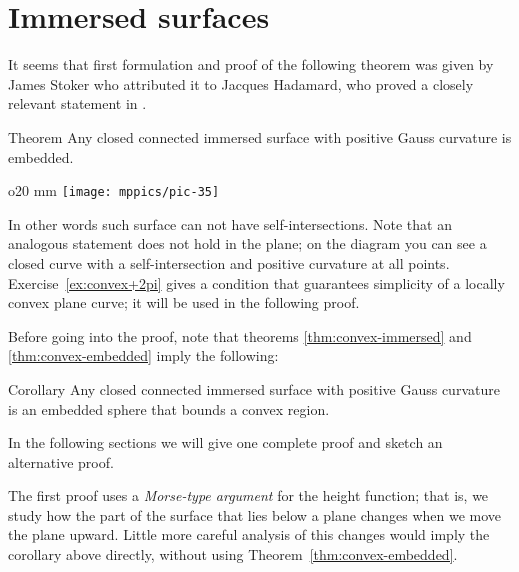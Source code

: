  


























\section*{Immersed surfaces}

It seems that first formulation and proof of the following theorem was given by James Stoker \cite{stoker} who attributed it to Jacques Hadamard, who proved a closely relevant statement in \cite[item 23]{hadamard}.


\begin{thm}{Theorem}\label{thm:convex-immersed}
Any closed connected immersed surface with positive Gauss curvature is embedded.
\end{thm}

\begin{wrapfigure}{o}{20 mm}
\vskip-0mm
\centering
\texttt{[image: mppics/pic-35]}
\vskip-0mm
\end{wrapfigure}

In other words such surface can not have self-intersections.
Note that an analogous statement does not hold in the plane;
on the diagram you can see a closed curve with a self-intersection and positive curvature at all points.
Exercise~\ref{ex:convex+2pi} gives a condition that guarantees simplicity of a locally convex plane curve;
it will be used in the following proof.



Before going into the proof, note that theorems \ref{thm:convex-immersed} and \ref{thm:convex-embedded}
imply the following:

\begin{thm}{Corollary}
Any closed connected immersed surface with positive Gauss curvature is an embedded sphere that bounds a convex region.
\end{thm}

In the following sections we will give one complete proof and sketch an alternative proof.

The first proof uses a \emph{Morse-type argument} for the height function;
that is, we study how the part of the surface that lies below a plane changes when we move the plane upward.
Little more careful analysis of this changes would imply the corollary above directly, without using Theorem~\ref{thm:convex-embedded}.

